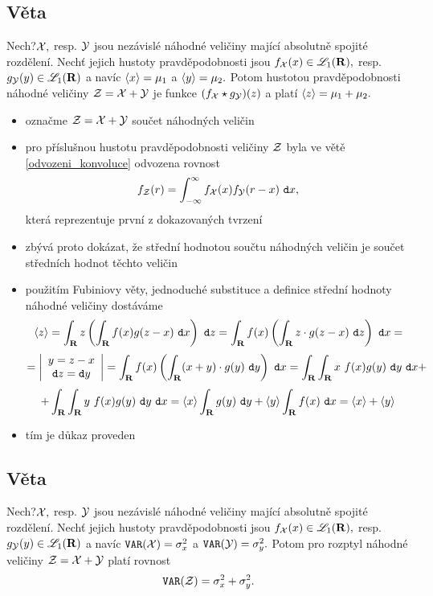 \subsection{Věta}
Nech?${\mathcal X},$ resp. ${\mathcal Y}$ jsou nezávislé náhodné veličiny maj\'ic\'i absolutn\v e spojit\'e rozd\v elen\'i. Nech\v t jejich hustoty pravděpodobnosti jsou $f_{\mathcal X}(x)\in{\mathscr L}_1({\mathbf R}),$ resp. $g_{\mathcal Y}(y)\in{\mathscr L}_1({\mathbf R})$ a nav\'ic $\langle x \rangle=\mu_1$ a
$\langle y \rangle=\mu_2.$ Potom hustotou pravděpodobnosti náhodné veličiny
${\mathcal{Z}}={\mathcal X}+{\mathcal Y}$ je funkce $(f_{\mathcal X} \star g_{\mathcal Y})(z)$ a platí $\langle z
\rangle=\mu_1+\mu_2.$\\

\Proof

\begin{itemize}
\item označme ${\mathcal{Z}}={\mathcal X}+{\mathcal Y}$ sou\v cet n\'ahodn\'ych veli\v cin

\item pro p\v r\'islu\v snou hustotu pravděpodobnosti veli\v ciny ${\mathcal{Z}}$ byla ve v\v et\v e \ref{odvozeni_konvoluce} odvozena rovnost $$f_{\mathcal{Z}}(r)= \int_{-\infty}^\infty f_{\mathcal X}(x)f_{\mathcal Y}(r-x)~\mathtt{d}x,$$ kter\'a reprezentuje prvn\'i z dokazovan\'ych tvrzen\'i

\item zb\'yv\'a proto dok\'azat, \v ze st\v redn\'i hodnotou sou\v ctu n\'ahodn\'ych veli\v cin je sou\v cet st\v redn\'ich hodnot t\v echto veli\v cin

\item použitím Fubiniovy věty, jednoduché substituce a definice střední hodnoty náhodné veličiny dostáváme
%
$$\langle z \rangle=\int_{{\mathbf R}}z\left(\int_{{\mathbf R}}f(x)g(z-x)~\mathtt{d}x\right)~\mathtt{d}z=\int_{\mathbf R}
f(x)\left(\int_{\mathbf R} z\cdot g(z-x)~\mathtt{d}z\right)~\mathtt{d}x=$$
%
$$=\left|\begin{array}{c} y=z-x\\ \mathtt{d}z=\mathtt{d}y \end{array}\right|= \int_{\mathbf R}
f(x)\left(\int_{\mathbf R} (x+y)\cdot g(y)~\mathtt{d}y\right)~\mathtt{d}x=\int_{\mathbf R}\int_{\mathbf R}
x~f(x)g(y)~\mathtt{d}y~\mathtt{d}x{}+$$
%
$$+\int_{\mathbf R}\int_{\mathbf R}
y~f(x)g(y)~\mathtt{d}y~\mathtt{d}x=\langle x\rangle\int_{{\mathbf R}} g(y)~\mathtt{d}y+\langle y \rangle\int_{{\mathbf R}}
f(x)~\mathtt{d}x=\langle x \rangle+\langle y \rangle$$

\item t\'im je d\r ukaz proveden

\end{itemize}

\subsection{Věta}
Nech?${\mathcal X},$ resp. ${\mathcal Y}$ jsou nezávislé náhodné veličiny maj\'ic\'i absolutn\v e spojit\'e rozd\v elen\'i. Nech\v t jejich hustoty pravděpodobnosti jsou $f_{\mathcal X}(x)\in{\mathscr L}_1({\mathbf R}),$ resp. $g_{\mathcal Y}(y)\in{\mathscr L}_1({\mathbf R})$ a nav\'ic $\mathtt{VAR}({\mathcal X})=\sigma_x^2$ a
$\mathtt{VAR}({\mathcal Y})=\sigma_y^2.$ Potom pro rozptyl n\'ahodn\'e veli\v ciny ${\mathcal{Z}}={\mathcal X}+{\mathcal Y}$ plat\'i rovnost
%
$$\mathtt{VAR}({\mathcal{Z}})=\sigma_x^2+\sigma_y^2.$$

